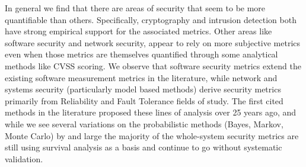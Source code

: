 In general we find that there are areas of security that seem to be more quantifiable than others. Specifically, cryptography and intrusion detection both have strong empirical support for the associated metrics. Other areas like software security and network security, appear to rely on more subjective metrics even when those metrics are themselves quantified through some analytical methods like CVSS scoring. We observe that software security metrics extend the existing software measurement metrics in the literature, while network and systems security (particularly model based methods) derive security metrics primarily from Reliability and Fault Tolerance fields of study. The first cited methods in the literature proposed these lines of analysis over 25 years ago, and while we see several variations on the probabilistic methods (Bayes, Markov, Monte Carlo) by and large the majority of the whole-system security metrics are still using survival analysis as a basis and continue to go without systematic validation\cite{ Pendleton_Garcia-Lebron_Cho_Xu_2016,Ramos_Lazar_Filho_Rodrigues_2017,Verendel_2009, Morrison_Moye_Pandita_Williams_2018}.